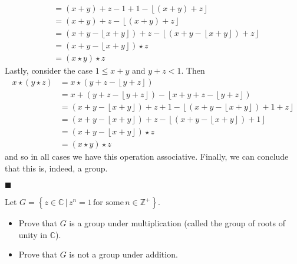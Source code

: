 \documentclass[12pt]{article}
\renewcommand{\qed}{\hfill$\blacksquare$}
\renewenvironment{proof}{\begin{addmargin}[1em]{0em}\begin{newproof}}{\end{newproof}\end{addmargin}\qed}
\newenvironment{problem}[2][Exercise]{\begin{trivlist}
\item[\hskip \labelsep {\bfseries #1}\hskip \labelsep {\bfseries #2.}]}{\end{trivlist}}
\begin{document}
\begin{proof}
\begin{equation*}
\begin{split}
        & = \left(x+y\right)+z-1+1 -\left\lfloor \left(x+y\right)+z\right\rfloor \\
        & = \left(x+y\right)+z - \left\lfloor \left(x+y\right) + z\right\rfloor \\
        & = \left(x+y-\left\lfloor x+y \right\rfloor \right) + z - \left\lfloor \left(x+y-\left\lfloor x+y\right\rfloor\right)+z\right\rfloor \\
        & = \left(x+y-\left\lfloor x+y \right\rfloor\right) \star z \\
        & = \left(x\star y\right)\star z
    \end{split}
\end{equation*}
Lastly, consider the case $1\leq x+y$ and $y+z < 1$. Then
\begin{equation*}
    \begin{split}
        x\star\left(y\star z\right) & = x \star \left(y+z-\left\lfloor y+z\right\rfloor \right) \\
        & = x+ \left(y+z-\left\lfloor y + z\right\rfloor \right) - \left\lfloor x + y+z - \left\lfloor y+z\right\rfloor \right) \\
        & = \left(x+y - \left\lfloor x+y\right\rfloor\right) + z + 1  - \left\lfloor \left(x+y-\left\lfloor x+y\right\rfloor \right) + 1 + z \right\rfloor \\
        & = \left(x+y - \left\lfloor x+y\right\rfloor\right) + z  - \left\lfloor \left(x+y-\left\lfloor x+y\right\rfloor \right) + 1 \right\rfloor \\
        & = \left(x+y-\left\lfloor x+y\right\rfloor \right)\star z \\
        & = \left(x\star y\right)\star z
    \end{split}
\end{equation*}
and so in all cases we have this operation associative. Finally, we can conclude that this is, indeed, a group.
\end{proof}






\begin{problem}{1.1.8}
Let $G=\left\{z\in \mathbb{C} \, | \, z^n=1 \, \text{for some} \, n\in\mathbb{Z}^+ \right\}$.
\begin{itemize}
    \item Prove that $G$ is a group under multiplication (called the group of roots of unity in $\mathbb{C}$).
    \item Prove that $G$ is not a group under addition.
\end{itemize}
\end{problem}
\end{document}
